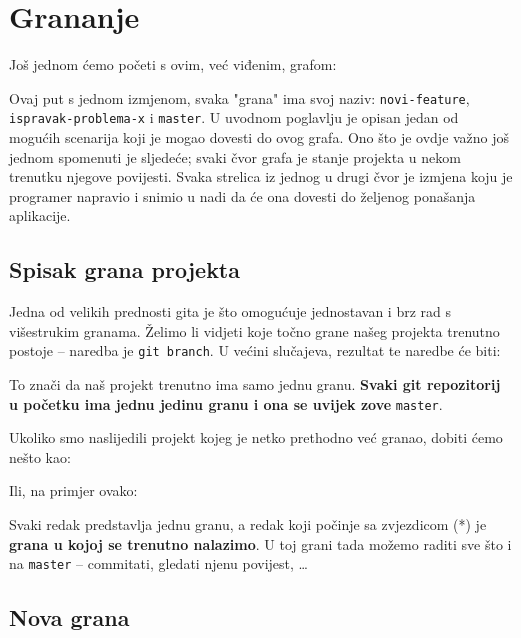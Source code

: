 \chapter*{Grananje}

Još jednom ćemo početi s ovim, već viđenim, grafom:



Ovaj put s jednom izmjenom, svaka "grana" ima svoj naziv: \verb+novi-feature+, \\ \verb+ispravak-problema-x+ i \verb+master+.
U uvodnom poglavlju je opisan jedan od mogućih scenarija koji je mogao dovesti do ovog grafa.
Ono što je ovdje važno još jednom spomenuti je sljedeće; svaki čvor grafa je stanje projekta u nekom trenutku njegove povijesti. 
Svaka strelica iz jednog u drugi čvor je izmjena koju je programer napravio i snimio u nadi da će ona dovesti do željenog ponašanja aplikacije.

\section*{Spisak grana projekta}

Jedna od velikih prednosti gita je što omogućuje jednostavan i brz rad s višestrukim granama.
Želimo li vidjeti koje točno grane našeg projekta trenutno postoje -- naredba je \verb+git branch+.
U većini slučajeva, rezultat te naredbe će biti:



To znači da naš projekt trenutno ima samo jednu granu.
\textbf{Svaki git repozitorij u početku ima jednu jedinu granu i ona se uvijek zove} \verb+master+.

Ukoliko smo naslijedili projekt kojeg je netko prethodno već granao, dobiti ćemo nešto kao:



Ili, na primjer ovako:



Svaki redak predstavlja jednu granu, a redak koji počinje sa zvjezdicom (*) je \textbf{grana u kojoj se trenutno nalazimo}.
U toj grani tada možemo raditi sve što i na \verb+master+ -- commitati, gledati njenu povijest, \dots

\section*{Nova grana}


